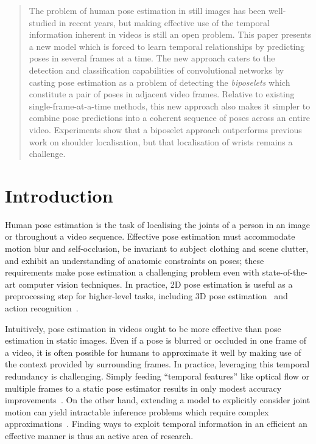 \documentclass[runningheads]{llncs}
\begin{document}
\begin{abstract}
The problem of human pose estimation in still images has been well-studied in
recent years, but making effective use of the temporal information inherent in
videos is still an open problem. This paper presents a new model which is forced
to learn temporal relationships by predicting poses in several frames at a time.
The new approach caters to the detection and classification capabilities of
convolutional networks by casting pose estimation as a problem of detecting the
\textit{biposelets} which constitute a pair of poses in adjacent video frames.
Relative to existing single-frame-at-a-time methods, this new approach also
makes it simpler to combine pose predictions into a coherent sequence of poses
across an entire video. Experiments show that a biposelet approach outperforms
previous work on shoulder localisation, but that localisation of wrists remains
a challenge.
\end{abstract}

\section{Introduction}\label{sec:intro}

Human pose estimation is the task of localising the joints of a person in an
image or throughout a video sequence. Effective pose estimation must accommodate
motion blur and self-occlusion, be invariant to subject clothing and scene
clutter, and exhibit an understanding of anatomic constraints on poses; these
requirements make pose estimation a challenging problem even with
state-of-the-art computer vision techniques. In practice, 2D pose estimation is
useful as a preprocessing step for higher-level tasks, including 3D pose
estimation~\cite{andriluka2010monocular,zhou2016spatio} and action
recognition~\cite{cheron2015p,yao2011does}.

Intuitively, pose estimation in videos ought to be more effective than pose
estimation in static images. Even if a pose is blurred or occluded in one frame
of a video, it is often possible for humans to approximate it well by making use
of the context provided by surrounding frames. In practice, leveraging this
temporal redundancy is challenging. Simply feeding ``temporal features'' like
optical flow or multiple frames to a static pose estimator results in only
modest accuracy improvements~\cite{jain2014modeep}. On the other hand, extending
a model to explicitly consider joint motion can yield intractable inference
problems which require complex approximations~\cite{cherian2014mixing}.
Finding ways to exploit temporal information in an efficient an effective manner
is thus an active area of research.
\end{document}
